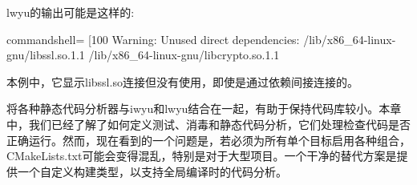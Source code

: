 lwyu的输出可能是这样的:

\begin{tcblisting}{commandshell={}}
[100%
Warning: Unused direct dependencies:
        /lib/x86_64-linux-gnu/libssl.so.1.1
        /lib/x86_64-linux-gnu/libcrypto.so.1.1
\end{tcblisting}

本例中，它显示libssl.so连接但没有使用，即使是通过依赖间接连接的。

将各种静态代码分析器与iwyu和lwyu结合在一起，有助于保持代码库较小。本章中，我们已经了解了如何定义测试、消毒和静态代码分析，它们处理检查代码是否正确运行。然而，现在看到的一个问题是，若必须为所有单个目标启用各种组合，CMakeLists.txt可能会变得混乱，特别是对于大型项目。一个干净的替代方案是提供一个自定义构建类型，以支持全局编译时的代码分析。













